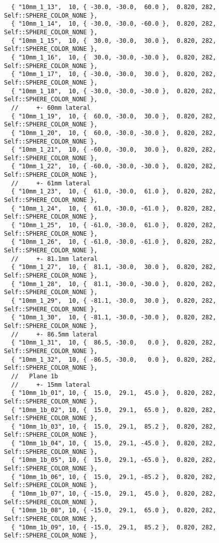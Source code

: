 \documentclass{InsightArticle}
\begin{document}
{\begin{verbatim}
  { "10mm_1_13",  10, { -30.0, -30.0,  60.0 },  0.820, 282, Self::SPHERE_COLOR_NONE },
  { "10mm_1_14",  10, { -30.0, -30.0, -60.0 },  0.820, 282, Self::SPHERE_COLOR_NONE },
  { "10mm_1_15",  10, {  30.0, -30.0,  30.0 },  0.820, 282, Self::SPHERE_COLOR_NONE },
  { "10mm_1_16",  10, {  30.0, -30.0, -30.0 },  0.820, 282, Self::SPHERE_COLOR_NONE },
  { "10mm_1_17",  10, { -30.0, -30.0,  30.0 },  0.820, 282, Self::SPHERE_COLOR_NONE },
  { "10mm_1_18",  10, { -30.0, -30.0, -30.0 },  0.820, 282, Self::SPHERE_COLOR_NONE },
  //     +- 60mm lateral
  { "10mm_1_19",  10, {  60.0, -30.0,  30.0 },  0.820, 282, Self::SPHERE_COLOR_NONE },
  { "10mm_1_20",  10, {  60.0, -30.0, -30.0 },  0.820, 282, Self::SPHERE_COLOR_NONE },
  { "10mm_1_21",  10, { -60.0, -30.0,  30.0 },  0.820, 282, Self::SPHERE_COLOR_NONE },
  { "10mm_1_22",  10, { -60.0, -30.0, -30.0 },  0.820, 282, Self::SPHERE_COLOR_NONE },
  //     +- 61mm lateral
  { "10mm_1_23",  10, {  61.0, -30.0,  61.0 },  0.820, 282, Self::SPHERE_COLOR_NONE },
  { "10mm_1_24",  10, {  61.0, -30.0, -61.0 },  0.820, 282, Self::SPHERE_COLOR_NONE },
  { "10mm_1_25",  10, { -61.0, -30.0,  61.0 },  0.820, 282, Self::SPHERE_COLOR_NONE },
  { "10mm_1_26",  10, { -61.0, -30.0, -61.0 },  0.820, 282, Self::SPHERE_COLOR_NONE },
  //     +- 81.1mm lateral
  { "10mm_1_27",  10, {  81.1, -30.0,  30.0 },  0.820, 282, Self::SPHERE_COLOR_NONE },
  { "10mm_1_28",  10, {  81.1, -30.0, -30.0 },  0.820, 282, Self::SPHERE_COLOR_NONE },
  { "10mm_1_29",  10, { -81.1, -30.0,  30.0 },  0.820, 282, Self::SPHERE_COLOR_NONE },
  { "10mm_1_30",  10, { -81.1, -30.0, -30.0 },  0.820, 282, Self::SPHERE_COLOR_NONE },
  //     +- 86.5mm lateral
  { "10mm_1_31",  10, {  86.5, -30.0,   0.0 },  0.820, 282, Self::SPHERE_COLOR_NONE },
  { "10mm_1_32",  10, { -86.5, -30.0,   0.0 },  0.820, 282, Self::SPHERE_COLOR_NONE },
  //   Plane 1b
  //     +- 15mm lateral
  { "10mm_1b_01", 10, {  15.0,  29.1,  45.0 },  0.820, 282, Self::SPHERE_COLOR_NONE },
  { "10mm_1b_02", 10, {  15.0,  29.1,  65.0 },  0.820, 282, Self::SPHERE_COLOR_NONE },
  { "10mm_1b_03", 10, {  15.0,  29.1,  85.2 },  0.820, 282, Self::SPHERE_COLOR_NONE },
  { "10mm_1b_04", 10, {  15.0,  29.1, -45.0 },  0.820, 282, Self::SPHERE_COLOR_NONE },
  { "10mm_1b_05", 10, {  15.0,  29.1, -65.0 },  0.820, 282, Self::SPHERE_COLOR_NONE },
  { "10mm_1b_06", 10, {  15.0,  29.1, -85.2 },  0.820, 282, Self::SPHERE_COLOR_NONE },
  { "10mm_1b_07", 10, { -15.0,  29.1,  45.0 },  0.820, 282, Self::SPHERE_COLOR_NONE },
  { "10mm_1b_08", 10, { -15.0,  29.1,  65.0 },  0.820, 282, Self::SPHERE_COLOR_NONE },
  { "10mm_1b_09", 10, { -15.0,  29.1,  85.2 },  0.820, 282, Self::SPHERE_COLOR_NONE },

\end{verbatim}}
\end{document}
